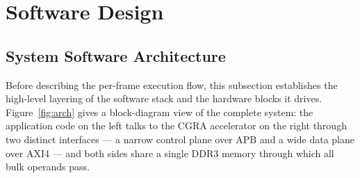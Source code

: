 \section{Software Design}
\label{sec:ch4-design}

\subsection{System Software Architecture}
\label{ssec:arch}

Before describing the per-frame execution flow, this subsection
establishes the high-level layering of the software stack and the
hardware blocks it drives. Figure~\ref{fig:arch} gives a block-diagram
view of the complete system: the application code on the left talks
to the CGRA accelerator on the right through two distinct interfaces
--- a narrow control plane over APB and a wide data plane over AXI4 ---
and both sides share a single DDR3 memory through which all bulk
operands pass.

